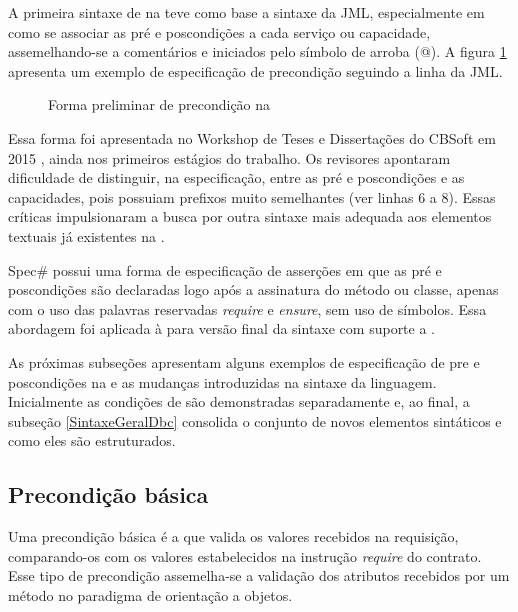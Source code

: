 A primeira sintaxe de \designbycontract{} na \neoidl{} teve como
base a sintaxe da JML, especialmente em como se associar as pré e poscondições a
cada serviço ou capacidade, assemelhando-se a comentários e iniciados pelo
símbolo de arroba (@). A figura \ref{lst:precondicaoJML-neo} apresenta um
exemplo de especificação de precondição seguindo a linha da JML.

\vspace{6mm}

\begin{figure}[h]
\begin{small}

\vspace{-.5cm}
\end{small} 
\caption{Forma preliminar de precondição na \neoidl}
\label{lst:precondicaoJML-neo}
\end{figure}

Essa forma foi apresentada no Workshop de Teses e Dissertações do CBSoft em 2015
\cite{lima2015contratos}, ainda nos primeiros estágios do trabalho. Os revisores
apontaram dificuldade de distinguir, na especificação, entre as pré e
poscondições e as capacidades, pois possuiam prefixos muito
semelhantes (ver linhas 6 a 8).
Essas críticas impulsionaram a busca por outra sintaxe mais adequada aos elementos textuais já
existentes na \neoidl{}.

Spec\# possui uma forma de especificação de asserções em que as pré e
poscondições são declaradas logo após a assinatura do método ou classe, apenas
com o uso das palavras reservadas \emph{require} e \emph{ensure}, sem uso de
símbolos. Essa abordagem foi aplicada à \neoidl{} para versão final da sintaxe
com suporte a \designbycontract{}.

As próximas subseções apresentam alguns exemplos de especificação de pre e
poscondições na \neoidl{} e as mudanças introduzidas na sintaxe da linguagem.
Inicialmente as condições de \designbycontract{} são demonstradas separadamente
e, ao final, a subseção \ref{SintaxeGeralDbc} consolida o conjunto
de novos elementos sintáticos e como eles são estruturados.


\subsection{Precondição básica}
\label{precondicaoBasica}

Uma precondição básica é a que valida os valores recebidos na
requisição, comparando-os com os valores estabelecidos na instrução
\emph{require} do contrato. Esse tipo de precondição assemelha-se a validação
dos atributos recebidos por um método no paradigma de orientação a objetos.

